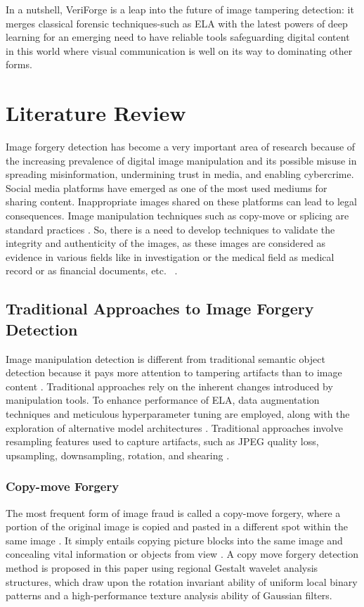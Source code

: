 \documentclass{ieeeaccess}
\begin{document}
In a nutshell, VeriForge is a leap into the future of image tampering detection: it merges classical forensic techniques-such as ELA with the latest powers of deep learning for an emerging need to have reliable tools safeguarding digital content in this world where visual communication is well on its way to dominating other forms.

\section{Literature Review}

Image forgery detection has become a very important area of research because of the increasing prevalence of digital image manipulation and its possible misuse in spreading misinformation, undermining trust in media, and enabling cybercrime. Social media platforms have emerged as one of the most used mediums for sharing content. Inappropriate images shared on these platforms can lead to legal consequences. Image manipulation techniques such as copy-move or splicing are standard practices \cite{10747914}. So, there is a need to develop techniques to validate the integrity and authenticity of the images, as these images are considered as evidence in various fields like in investigation or the medical field as medical record or as financial documents, etc. ~\cite{9670931}.

\subsection{Traditional Approaches to Image Forgery Detection}
Image manipulation detection is different from traditional semantic object detection because it pays more attention to tampering artifacts than to image content \cite{zhou2018learning}.
Traditional approaches rely on the inherent changes introduced by manipulation tools. To enhance performance of ELA, data augmentation techniques and meticulous hyperparameter tuning are employed, along with the exploration of alternative model architectures \cite{boustany2024image}.
 Traditional approaches involve resampling features used to capture artifacts, such as JPEG quality loss, upsampling, downsampling, rotation, and shearing \cite{8626149}. 
 
 \subsubsection{Copy-move Forgery} 
 The most frequent form of image fraud is called a copy-move forgery, where a portion of the original image is copied and pasted in a different spot within the same image \cite{10151341}. It simply entails copying picture blocks into the same image and concealing vital information or objects from view \cite{chou2018copy}. A copy move forgery detection method is proposed in this paper using regional Gestalt wavelet analysis structures, which draw upon the rotation invariant ability of uniform local binary patterns and a high-performance texture analysis ability of Gaussian filters.
 
\end{document}
